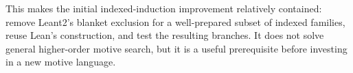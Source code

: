 This makes the initial indexed-induction improvement relatively contained:
remove Leant2's blanket exclusion for a well-prepared subset of indexed
families, reuse Lean's construction, and test the resulting branches. It does
not solve general higher-order motive search, but it is a useful prerequisite
before investing in a new motive language.
